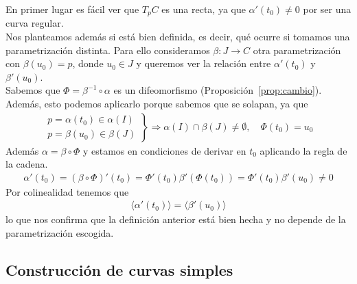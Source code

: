 \begin{observacion}
    En primer lugar es fácil ver que $T_pC$ es una recta, ya que $\alpha'(t_0)\neq 0$ por ser una curva regular. \\
    
    Nos planteamos además si está bien definida, es decir, qué ocurre si tomamos una parametrización distinta. Para ello consideramos $\beta: J \to C$ otra parametrización con $\beta(u_0)=p$, donde $u_0\in J$ y queremos ver la relación entre $\alpha'(t_0)$ y $\beta'(u_0)$.\\

    Sabemos que $\Phi = \beta^{-1} \circ \alpha$ es un difeomorfismo (Proposición~\ref{prop:cambio}). Además, esto podemos aplicarlo porque sabemos que se solapan, ya que 
    \begin{gather*}
        \left.
        \begin{array}{l}
            p = \alpha(t_0) \in \alpha (I)\\[0.8em]
            p = \beta(u_0) \in \beta(J)
        \end{array}
        \right\} \Rightarrow \alpha(I) \cap \beta(J) \neq \emptyset,\quad \Phi(t_0) = u_0
    \end{gather*} 
    Además $\alpha = \beta \circ \Phi$ y estamos en condiciones de derivar en $t_0$ aplicando la regla de la cadena.
    \begin{gather*}
        \alpha'(t_0) = (\beta \circ \Phi)'(t_0) = \Phi'(t_0)\beta'(\Phi(t_0)) = \Phi'(t_0)\beta'(u_0) \neq 0
    \end{gather*}
    Por colinealidad tenemos que 
    \begin{gather*}
        \langle \alpha'(t_0) \rangle = \langle \beta'(u_0) \rangle
    \end{gather*}
    lo que nos confirma que la definición anterior está bien hecha y no depende de la parametrización escogida.
\end{observacion}

\subsection{Construcción de curvas simples}

